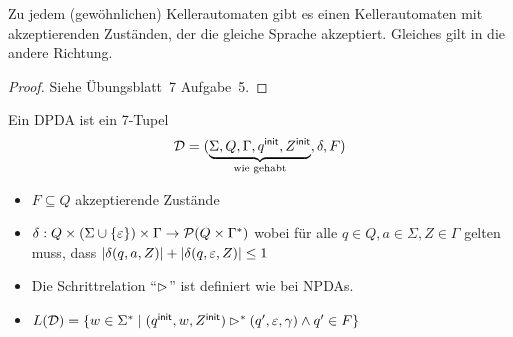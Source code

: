 \begin{lemma}
Zu jedem (gewöhnlichen) Kellerautomaten gibt es einen Kellerautomaten mit akzeptierenden Zuständen, der die gleiche Sprache akzeptiert.
Gleiches gilt in die andere Richtung.
\end{lemma}
\begin{proof}
Siehe Übungsblatt~7 Aufgabe~5.
\end{proof}




\begin{Def}[name={[DPDA]}]
        Ein \ac{DPDA} ist ein 7-Tupel
        $$\mathcal{D} = (\underbrace{\Sigma,Q,\Gamma,q^\mathsf{init},Z^\mathsf{init}}_{\text{wie gehabt}},\delta,F)$$
        \vspace{-1em}
        \begin{itemize}
        \item $F\subseteq Q$ akzeptierende Zustände
        \item $\delta: Q\x (\Sigma\cup\{\Eps\})\x \Gamma \-> \mathcal{P}(Q\x \Gamma^*)$ wobei für alle $q\in Q,a\in\Sigma,Z\in\Gamma$ gelten muss, dass
        $|\delta(q,a,Z)| + |\delta(q,\varepsilon,Z)| \leq 1$
        \item Die Schrittrelation "`$\rhd$"' ist definiert wie bei \ac{NPDA}s.
        \item $L(\mathcal{D}) = \{w\in\Sigma^* \mid (q^\mathsf{init},w,Z^\mathsf{init}) \rhd^* (q',\varepsilon,\gamma) \land q'\in F \}$ \qedhere
        \end{itemize}
\end{Def}

